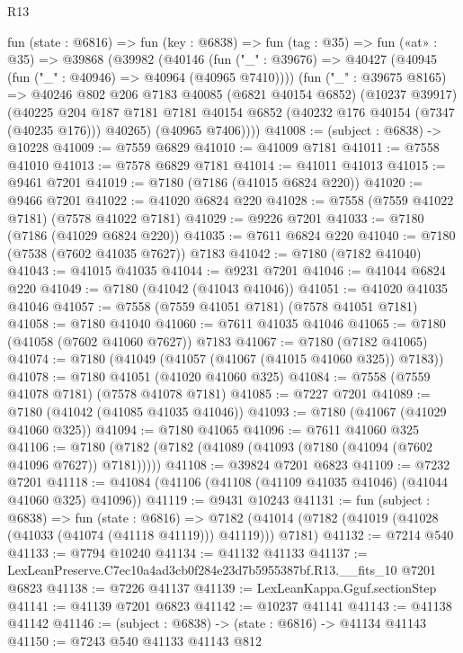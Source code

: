 \begin{lexlean}{R13}
\begin{coremodule}
  fun (state : @6816) =>
  fun (key : @6838) =>
  fun (tag : @35) =>
  fun («at» : @35) =>
  @39868
    (@39982
      (@40146
        (fun ("_" : @39676) => @40427 (@40945 (fun ("_" : @40946) => @40964 (@40965 @7410))))
        (fun ("_" : @39675 @8165) =>
        @40246
          @802
          @206
          @7183
          @40085
          (@6821 @40154 @6852)
          (@10237 @39917)
          (@40225
            @204
            @187
            @7181
            @7181
            @40154
            @6852
            (@40232 @176 @40154 (@7347 (@40235 @176)))
            @40265)
          (@40965 @7406))))
@41008 := (subject : @6838) -> @10228
@41009 := @7559 @6829
@41010 := @41009 @7181
@41011 := @7558 @41010
@41013 := @7578 @6829 @7181
@41014 := @41011 @41013
@41015 := @9461 @7201
@41019 := @7180 (@7186 (@41015 @6824 @220))
@41020 := @9466 @7201
@41022 := @41020 @6824 @220
@41028 := @7558 (@7559 @41022 @7181) (@7578 @41022 @7181)
@41029 := @9226 @7201
@41033 := @7180 (@7186 (@41029 @6824 @220))
@41035 := @7611 @6824 @220
@41040 := @7180 (@7538 (@7602 @41035 @7627)) @7183
@41042 := @7180 (@7182 @41040)
@41043 := @41015 @41035
@41044 := @9231 @7201
@41046 := @41044 @6824 @220
@41049 := @7180 (@41042 (@41043 @41046))
@41051 := @41020 @41035 @41046
@41057 := @7558 (@7559 @41051 @7181) (@7578 @41051 @7181)
@41058 := @7180 @41040
@41060 := @7611 @41035 @41046
@41065 := @7180 (@41058 (@7602 @41060 @7627)) @7183
@41067 := @7180 (@7182 @41065)
@41074 := @7180 (@41049 (@41057 (@41067 (@41015 @41060 @325)) @7183))
@41078 := @7180 @41051 (@41020 @41060 @325)
@41084 := @7558 (@7559 @41078 @7181) (@7578 @41078 @7181)
@41085 := @7227 @7201
@41089 := @7180 (@41042 (@41085 @41035 @41046))
@41093 := @7180 (@41067 (@41029 @41060 @325))
@41094 := @7180 @41065
@41096 := @7611 @41060 @325
@41106 := @7180 (@7182 (@7182 (@41089 (@41093 (@7180 (@41094 (@7602 @41096 @7627)) @7181)))))
@41108 := @39824 @7201 @6823
@41109 := @7232 @7201
@41118 := @41084 (@41106 (@41108 (@41109 @41035 @41046) (@41044 @41060 @325) @41096))
@41119 := @9431 @10243
@41131 := fun (subject : @6838) =>
  fun (state : @6816) =>
  @7182 (@41014 (@7182 (@41019 (@41028 (@41033 (@41074 (@41118 @41119))) @41119))) @7181)
@41132 := @7214 @540
@41133 := @7794 @10240
@41134 := @41132 @41133
@41137 := LexLeanPreserve.C7ec10a4ad3cb0f284e23d7b5955387bf.R13.__fits_10 @7201 @6823
@41138 := @7226 @41137
@41139 := LexLeanKappa.Gguf.sectionStep
@41141 := @41139 @7201 @6823
@41142 := @10237 @41141
@41143 := @41138 @41142
@41146 := (subject : @6838) -> (state : @6816) -> @41134 @41143
@41150 := @7243 @540 @41133 @41143 @812

\end{coremodule}
\end{lexlean}
